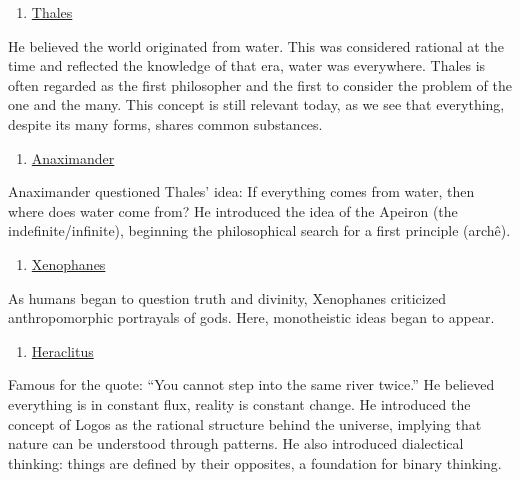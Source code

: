 \begin{enumerate}
\def\labelenumi{\alph{enumi})}
\tightlist
\item
  \href{https://en.wikipedia.org/wiki/Thales_of_Miletus}{Thales}
\end{enumerate}

He believed the world originated from water. This was considered
rational at the time and reflected the knowledge of that era, water was
everywhere. Thales is often regarded as the first philosopher and the
first to consider the problem of the one and the many. This concept is
still relevant today, as we see that everything, despite its many forms,
shares common substances.

\begin{enumerate}
\def\labelenumi{\alph{enumi})}
\setcounter{enumi}{1}
\tightlist
\item
  \href{https://en.wikipedia.org/wiki/Anaximander}{Anaximander}
\end{enumerate}

Anaximander questioned Thales' idea: If everything comes from water,
then where does water come from? He introduced the idea of the Apeiron
(the indefinite/infinite), beginning the philosophical search for a
first principle (archê).

\begin{enumerate}
\def\labelenumi{\alph{enumi})}
\setcounter{enumi}{2}
\tightlist
\item
  \href{https://en.wikipedia.org/wiki/Xenophanes}{Xenophanes}
\end{enumerate}

As humans began to question truth and divinity, Xenophanes criticized
anthropomorphic portrayals of gods. Here, monotheistic ideas began to
appear.

\begin{enumerate}
\def\labelenumi{\alph{enumi})}
\setcounter{enumi}{3}
\tightlist
\item
  \href{https://en.wikipedia.org/wiki/Heraclitus}{Heraclitus}
\end{enumerate}

Famous for the quote: ``You cannot step into the same river twice.'' He
believed everything is in constant flux, reality is constant change. He
introduced the concept of Logos as the rational structure behind the
universe, implying that nature can be understood through patterns. He
also introduced dialectical thinking: things are defined by their
opposites, a foundation for binary thinking.

